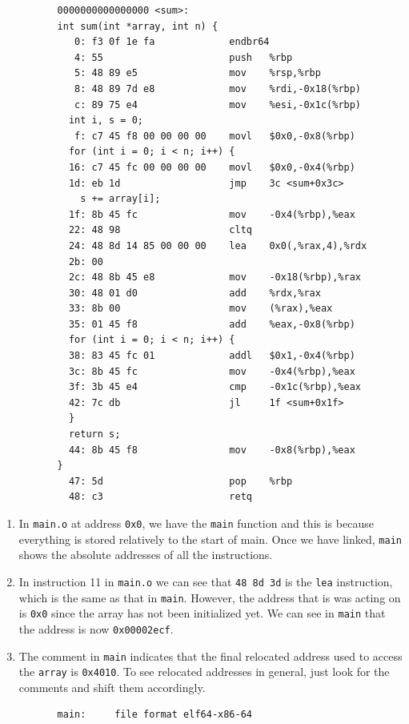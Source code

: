\documentclass{article}
\begin{document}
\begin{example}
\begin{lstlisting}
          0000000000000000 <sum>:
          int sum(int *array, int n) {
             0:	f3 0f 1e fa          	endbr64 
             4:	55                   	push   %rbp
             5:	48 89 e5             	mov    %rsp,%rbp
             8:	48 89 7d e8          	mov    %rdi,-0x18(%rbp)
             c:	89 75 e4             	mov    %esi,-0x1c(%rbp)
            int i, s = 0; 
             f:	c7 45 f8 00 00 00 00 	movl   $0x0,-0x8(%rbp)
            for (int i = 0; i < n; i++) {
            16:	c7 45 fc 00 00 00 00 	movl   $0x0,-0x4(%rbp)
            1d:	eb 1d                	jmp    3c <sum+0x3c>
              s += array[i]; 
            1f:	8b 45 fc             	mov    -0x4(%rbp),%eax
            22:	48 98                	cltq   
            24:	48 8d 14 85 00 00 00 	lea    0x0(,%rax,4),%rdx
            2b:	00 
            2c:	48 8b 45 e8          	mov    -0x18(%rbp),%rax
            30:	48 01 d0             	add    %rdx,%rax
            33:	8b 00                	mov    (%rax),%eax
            35:	01 45 f8             	add    %eax,-0x8(%rbp)
            for (int i = 0; i < n; i++) {
            38:	83 45 fc 01          	addl   $0x1,-0x4(%rbp)
            3c:	8b 45 fc             	mov    -0x4(%rbp),%eax
            3f:	3b 45 e4             	cmp    -0x1c(%rbp),%eax
            42:	7c db                	jl     1f <sum+0x1f>
            }
            return s; 
            44:	8b 45 f8             	mov    -0x8(%rbp),%eax
          }
            47:	5d                   	pop    %rbp
            48:	c3                   	retq  
        \end{lstlisting}
        \begin{enumerate}
          \item In \texttt{main.o} at address \texttt{0x0}, we have the \texttt{main} function and this is because everything is stored relatively to the start of main. Once we have linked, \texttt{main} shows the absolute addresses of all the instructions. 
          \item In instruction 11 in \texttt{main.o} we can see that \texttt{48 8d 3d} is the \texttt{lea} instruction, which is the same as that in \texttt{main}. However, the address that is was acting on is \texttt{0x0} since the array has not been initialized yet. We can see in \texttt{main} that the address is now \texttt{0x00002ecf}. 
          \item The comment in \texttt{main} indicates that the final relocated address used to access the \texttt{array} is \texttt{0x4010}. To see relocated addresses in general, just look for the comments and shift them accordingly. 
        \end{enumerate}
        \begin{lstlisting}
          main:     file format elf64-x86-64


\end{lstlisting}
\end{example}
\end{document}
